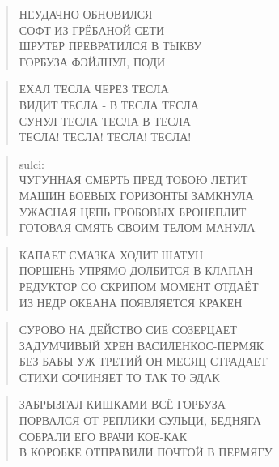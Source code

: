 \poemtitle{***}
\begin{verse}
НЕУДАЧНО ОБНОВИЛСЯ\\
СОФТ ИЗ ГРЁБАНОЙ СЕТИ\\
ШРУТЕР ПРЕВРАТИЛСЯ В ТЫКВУ\\
ГОРБУЗА ФЭЙЛНУЛ, ПОДИ
\end{verse}

\poemtitle{***}
\begin{verse}
ЕХАЛ ТЕСЛА ЧЕРЕЗ ТЕСЛА\\
ВИДИТ ТЕСЛА - В ТЕСЛА ТЕСЛА\\
СУНУЛ ТЕСЛА ТЕСЛА В ТЕСЛА\\
ТЕСЛА! ТЕСЛА! ТЕСЛА! ТЕСЛА!    
\end{verse}

\poemtitle{***}
\begin{verse}
sulci: \\
ЧУГУННАЯ СМЕРТЬ ПРЕД ТОБОЮ ЛЕТИТ\\
МАШИН БОЕВЫХ ГОРИЗОНТЫ ЗАМКНУЛА\\
УЖАСНАЯ ЦЕПЬ ГРОБОВЫХ БРОНЕПЛИТ\\
ГОТОВАЯ СМЯТЬ СВОИМ ТЕЛОМ МАНУЛА
\end{verse}

\poemtitle{***}
\begin{verse}
КАПАЕТ СМАЗКА ХОДИТ ШАТУН\\
ПОРШЕНЬ УПРЯМО ДОЛБИТСЯ В КЛАПАН\\
РЕДУКТОР СО СКРИПОМ МОМЕНТ ОТДАЁТ\\
ИЗ НЕДР ОКЕАНА ПОЯВЛЯЕТСЯ КРАКЕН
\end{verse}

\poemtitle{***}
\begin{verse}
СУРОВО НА ДЕЙСТВО СИЕ СОЗЕРЦАЕТ\\
ЗАДУМЧИВЫЙ ХРЕН ВАСИЛЕНКОС-ПЕРМЯК\\
БЕЗ БАБЫ УЖ ТРЕТИЙ ОН МЕСЯЦ СТРАДАЕТ\\
СТИХИ СОЧИНЯЕТ ТО ТАК ТО ЭДАК
\end{verse}

\poemtitle{***}
\begin{verse}
ЗАБРЫЗГАЛ КИШКАМИ ВСЁ ГОРБУЗА\\
ПОРВАЛСЯ ОТ РЕПЛИКИ СУЛЬЦИ, БЕДНЯГА\\
СОБРАЛИ ЕГО ВРАЧИ КОЕ-КАК\\
В КОРОБКЕ ОТПРАВИЛИ ПОЧТОЙ В ПЕРМЯГУ
\end{verse}

